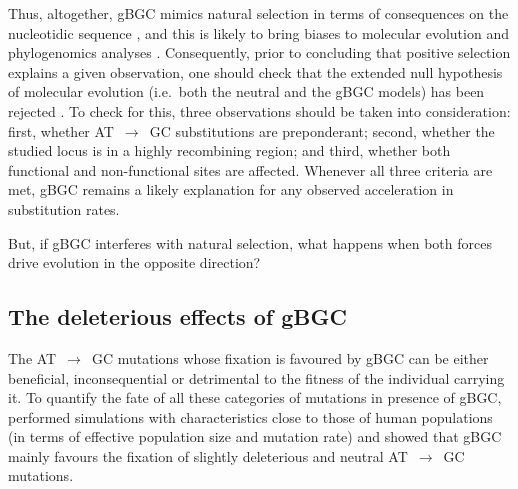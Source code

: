 Thus, altogether, gBGC mimics natural selection in terms of consequences on the nucleotidic sequence \citep{bherer2014biased}, and this is likely to bring biases to molecular evolution and phylogenomics analyses \citep{berglund2009hotspots,ratnakumar2010detecting,webster2012direct,romiguier2013less,romiguier2016phylogenomics,romiguier2017analytical,bolivar2018biased,bolivar2019gcbiased,rousselle2019influence}.
Consequently, prior to concluding that positive selection explains a given observation, one should check that the extended null hypothesis of molecular evolution (i.e.\ both the neutral and the gBGC models) has been rejected \citep{galtier2007adaptation, duret2009biased}.
To check for this, three observations should be taken into consideration: first, whether AT~$\rightarrow$~GC substitutions are preponderant; second, whether the studied locus is in a highly recombining region; and third, whether both functional and non-functional sites are affected.
Whenever all three criteria are met, gBGC remains a likely explanation for any observed acceleration in substitution rates.

But, if gBGC interferes with natural selection, what happens when both forces drive evolution in the opposite direction? 




\subsection{The deleterious effects of gBGC}

The AT~$\rightarrow$~GC mutations whose fixation is favoured by gBGC can be either beneficial, inconsequential or detrimental to the fitness of the individual carrying it.
To quantify the fate of all these categories of mutations in presence of gBGC, \citet{duret2009biased} performed simulations with characteristics close to those of human populations (in terms of effective population size and mutation rate) and showed that gBGC mainly favours the fixation of slightly deleterious and neutral AT~$\rightarrow$~GC mutations.

